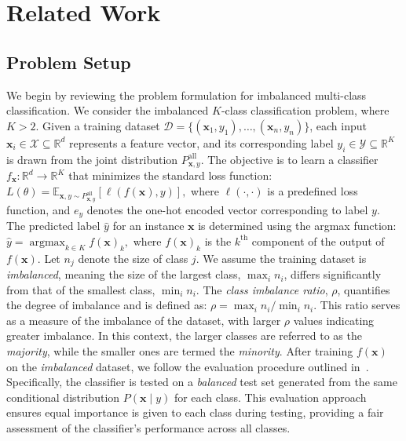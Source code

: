 \section{Related Work} \label{sec:related_work}
\subsection{Problem Setup}
We begin by reviewing the problem formulation for imbalanced multi-class classification. We consider the imbalanced $K$-class classification problem, where $K > 2$. Given a training dataset $\mathcal{D} = \{(\mathbf{x}_1, y_1), \dots, (\mathbf{x}_n, y_n)\}$, each input $\mathbf{x}_i \in \mathcal{X} \subseteq \mathbb{R}^d$ represents a feature vector, and its corresponding label $y_i \in \mathcal{Y} \subseteq \mathbb{R}^K$ is drawn from the joint distribution $P_{\mathbf{x}, y}^{\text{all}}$. The objective is to learn a classifier $f_{\mathbf{x}} \colon \mathbb{R}^d \to \mathbb{R}^K$ that minimizes the standard loss function:  
$L(\theta) = \mathbb{E}_{\mathbf{x}, y \sim P_{\mathbf{x}, y}^{\text{all}}} [\ell(f(\mathbf{x}), y)],$
where $\ell(\cdot, \cdot)$ is a predefined loss function, and $e_y$ denotes the one-hot encoded vector corresponding to label $y$. The predicted label $\hat{y}$ for an instance $\mathbf{x}$ is determined using the argmax function:  
$\hat{y} = \mathop{\arg\max}_{k \in K} f(\mathbf{x})_k,$
where $f(\mathbf{x})_k$ is the $k^{\text{th}}$ component of the output of $f(\mathbf{x})$.  
Let $n_j$ denote the size of class $j$. We assume the training dataset is \textit{imbalanced}, meaning the size of the largest class, $\max_i n_i$, differs significantly from that of the smallest class, $\min_i n_i$. The \textit{class imbalance ratio}, $\rho$, quantifies the degree of imbalance and is defined as:  
$\rho = \max_i n_i / \min_i n_i.$
This ratio serves as a measure of the imbalance of the dataset, with larger $\rho$ values indicating greater imbalance. In this context, the larger classes are referred to as the \emph{majority}, while the smaller ones are termed the \emph{minority}.  
After training $f(\mathbf{x})$ on the \textit{imbalanced} dataset, we follow the evaluation procedure outlined in~\cite{cao2019learning, cheng2023smote}. Specifically, the classifier is tested on a \textit{balanced} test set generated from the same conditional distribution $P(\mathbf{x} \mid y)$ for each class. This evaluation approach ensures equal importance is given to each class during testing, providing a fair assessment of the classifier's performance across all classes.


